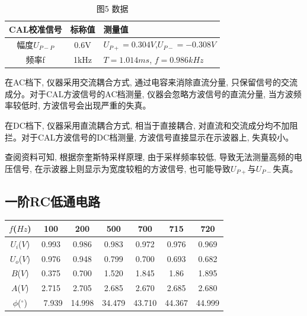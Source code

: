 \documentclass[a4paper]{article}
\begin{document}
    \vspace{1cm}

    \begin{table}[htbp]
        \centering
        \caption{图5 数据}
        \begin{tabular}{|c|c|p{6cm}|}
            \hline
            CAL校准信号  & 标称值  & 测量值                              \\
            \hline
            幅度$U_{P-P}$ & 0.6V & $U_{P+}=0.304V$,$U_{P-}=-0.308V$ \\
            \hline
            频率f         & 1kHz & $T=1.014ms$, $f=0.986kHz$        \\
            \hline
        \end{tabular}\label{tab:table2}
    \end{table}


    {在AC档下, 仪器采用交流耦合方式, 通过电容来消除直流分量, 只保留信号的交流成分。对于CAL方波信号的AC档测量, 仪器会忽略方波信号的直流分量, 当方波频率较低时, 方波信号会出现严重的失真。}

    {在DC档下, 仪器采用直流耦合方式, 相当于直接耦合, 对直流和交流成分均不加阻拦。对于CAL方波信号的DC档测量, 方波信号直接显示在示波器上, 失真较小。}

    {查阅资料可知, 根据奈奎斯特采样原理, 由于采样频率较低, 导致无法测量高频的电压信号, 在示波器上则显示为宽度较粗的方波信号, 也可能导致$U_{P+}$与$U_{P-}$失真。}

    \subsection{一阶RC低通电路}\label{subsec:rc3}


    \begin{tabular}{|c|c|c|c|c|c|c|}
        \hline
        $f$($Hz$)        & 100      & 200    & 500    & 700    & 715    & 720    \\
        \hline
        $U_{i}$($V$)       & 0.993    & 0.986  & 0.983  & 0.972  & 0.976  & 0.969  \\
        \hline
        $U_{o}$($V$)       & 0.976    & 0.948  & 0.799  & 0.700  & 0.693  & 0.682  \\
        \hline
        $B$($V$)           & 0.375    & 0.700  & 1.520  & 1.845  & 1.86   & 1.895  \\
        \hline
        $A$($V$)           & 2.715    & 2.705  & 2.685  & 2.670  & 2.685  & 2.680  \\
        \hline
        $\phi$($^{\circ}$) & \, 7.939 & 14.998 & 34.479 & 43.710 & 44.367 & 44.999 \\
        \hline
    \end{tabular}
\end{document}
